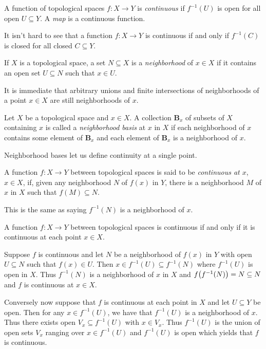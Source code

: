 \documentclass[letterpaper, 11pt, oneside]{book}
\begin{document}
\begin{defn}
  A function of topological spaces $f\colon X \to Y$ is \emph{continuous} if $f^{-1}(U)$ is open for all open $U \subseteq Y$.
  A \emph{map} is a continuous function.
\end{defn}

It isn't hard to see that a function $f\colon X \to Y$ is continuous if and only if $f^{-1}(C)$ is closed for all closed $C \subseteq Y$.

\begin{defn}[Neighborhood]
  If $X$ is a topological space, a set $N \subseteq X$ is a \emph{neighborhood} of $x \in X$ if it contains an open set $U \subseteq N$ such that $x \in U$.
\end{defn}

It is immediate that arbitrary unions and finite intersections of neighborhoods of a point $x \in X$ are still neighborhoods of $x$.

\begin{defn}
  Let $X$ be a topological space and $x \in X$.
  A collection $\textbf{B}_{x}$ of subsets of $X$ containing $x$ is called a \emph{neighborhood basis} at $x$ in $X$ if each neighborhood of $x$ contains some element of $\textbf{B}_{x}$ and each element of $\textbf{B}_{x}$ is a neighborhood of $x$.
\end{defn}

Neighborhood bases let us define continuity at a single point.

\begin{defn}
  A function $f\colon X \to Y$ between topological spaces is said to be \emph{continuous at $x$}, $x \in X$, if, given any neighborhood $N$ of $f(x)$ in $Y$, there is a neighborhood $M$ of $x$ in $X$ such that $f(M) \subseteq N$.
\end{defn}

This is the same as saying $f^{-1}(N)$ is a neighborhood of $x$.

\begin{prop}
  A function $f\colon X \to Y$ between topological spaces is continuous if and only if it is continuous at each point $x \in X$.
\end{prop}
\begin{pf}
  Suppose $f$ is continuous and let $N$ be a neighborhood of $f(x)$ in $Y$ with open $U \subseteq N$ such that $f(x) \in U$.
  Then $x \in f^{-1}(U) \subseteq f^{-1}(N)$ where $f^{-1}(U)$ is open in $X$.
  Thus $f^{-1}(N)$ is a neighborhood of $x$ in $X$ and $f\pqty{f^{-1}(N)} = N \subseteq N$ and $f$ is continuous at $x \in X$.

  Conversely now suppose that $f$ is continuous at each point in $X$ and let $U \subseteq Y$ be open.
  Then for any $x \in f^{-1}(U)$, we have that $f^{-1}(U)$ is a neighborhood of $x$.
  Thus there exists open $V_{x} \subseteq f^{-1}(U)$ with $x \in V_{x}$.
  Thus $f^{-1}(U)$ is the union of open sets $V_{x}$ ranging over $x \in f^{-1}(U)$ and $f^{-1}(U)$ is open which yields that $f$ is continuous.
\end{pf}
\end{document}
